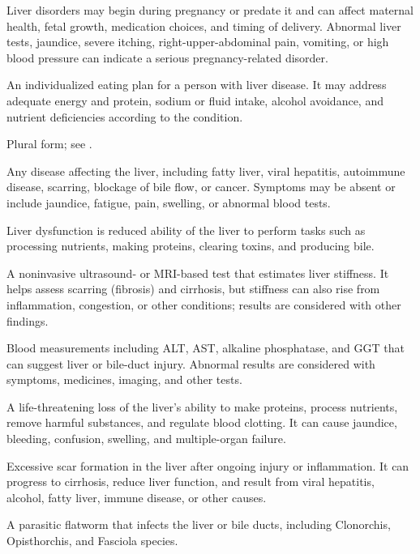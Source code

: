  Liver disorders may begin during pregnancy or predate it and can affect maternal health, fetal growth, medication choices, and timing of delivery. Abnormal liver tests, jaundice, severe itching, right-upper-abdominal pain, vomiting, or high blood pressure can indicate a serious pregnancy-related disorder.

 An individualized eating plan for a person with liver disease. It may address adequate energy and protein, sodium or fluid intake, alcohol avoidance, and nutrient deficiencies according to the condition.

 Plural form; see .

 Any disease affecting the liver, including fatty liver, viral hepatitis, autoimmune disease, scarring, blockage of bile flow, or cancer. Symptoms may be absent or include jaundice, fatigue, pain, swelling, or abnormal blood tests.

 Liver dysfunction is reduced ability of the liver to perform tasks such as processing nutrients, making proteins, clearing toxins, and producing bile.

 A noninvasive ultrasound- or MRI-based test that estimates liver stiffness. It helps assess scarring (fibrosis) and cirrhosis, but stiffness can also rise from inflammation, congestion, or other conditions; results are considered with other findings.

 Blood measurements including ALT, AST, alkaline phosphatase, and GGT that can suggest liver or bile-duct injury. Abnormal results are considered with symptoms, medicines, imaging, and other tests.

 A life-threatening loss of the liver's ability to make proteins, process nutrients, remove harmful substances, and regulate blood clotting. It can cause jaundice, bleeding, confusion, swelling, and multiple-organ failure.

 Excessive scar formation in the liver after ongoing injury or inflammation. It can progress to cirrhosis, reduce liver function, and result from viral hepatitis, alcohol, fatty liver, immune disease, or other causes.

 A parasitic flatworm that infects the liver or bile ducts, including Clonorchis, Opisthorchis, and Fasciola species.

